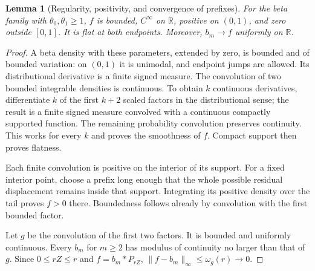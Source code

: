 \documentclass[11pt,a4paper]{article}
\numberwithin{equation}{section}
\newtheorem{lemma}[lemma]{Lemma}
\theoremstyle{definition}\newaliascnt{definition}{theorem}
\theoremstyle{remark}\newaliascnt{remark}{theorem}
\newcommand{\R}{\mathbb R}\newcommand{\N}{\mathbb N}
\begin{document}
\begin{lemma}[Regularity, positivity, and convergence of prefixes]
\label{lem:regularity}
For the beta family with $\theta_0,\theta_1\ge1$, $f$ is bounded,
$C^\infty$ on $\R$, positive on $(0,1)$, and zero outside $[0,1]$.
It is flat at both endpoints. Moreover, $b_m\to f$ uniformly on $\R$.
\end{lemma}
\begin{proof}
A beta density with these parameters, extended by zero, is bounded and of
bounded variation: on $(0,1)$ it is unimodal, and endpoint jumps are allowed.
Its distributional derivative is a finite signed measure. The convolution
of two bounded integrable densities is continuous. To obtain $k$ continuous
derivatives, differentiate $k$ of the first $k+2$ scaled factors in the
distributional sense; the result is a finite signed measure convolved with
a continuous compactly supported function. The remaining probability
convolution preserves continuity. This works for every $k$ and proves the
smoothness of $f$. Compact support then proves flatness.

Each finite convolution is positive on the interior of its support.
For a fixed interior point, choose a prefix long enough that the whole
possible residual displacement remains inside that support. Integrating
its positive density over the tail proves $f>0$ there. Boundedness follows
already by convolution with the first bounded factor.

Let $g$ be the convolution of the first two factors. It is bounded and
uniformly continuous. Every $b_m$ for $m\ge2$ has modulus of continuity no
larger than that of $g$. Since $0\le rZ\le r$ and $f=b_m*P_{rZ}$,
$\|f-b_m\|_\infty\le\omega_g(r)\to0$.
\end{proof}
\end{document}
